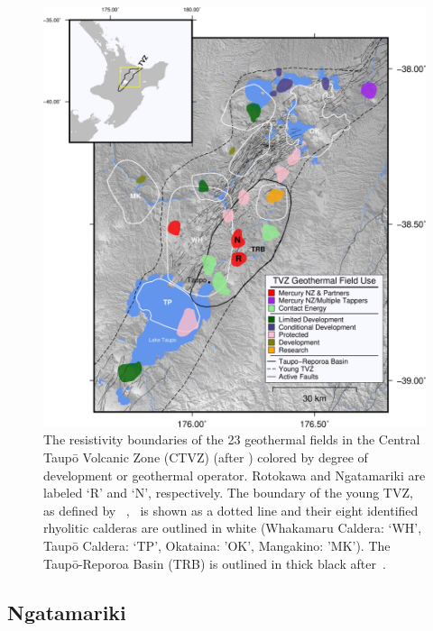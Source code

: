 \begin{figure}[h!]
\begin{center}
\includegraphics[width=1.00\columnwidth]{Chapter_1_Intro/figures/Geothermal_fields_TVZ_w_usage/TVZ_geothermal_overview_large}
\caption{{The resistivity boundaries of the 23 geothermal fields in the Central
Taup\={o} Volcanic Zone (CTVZ) (after \protect\citet{Bibby_1995}) colored by degree
of development or geothermal operator. Rotokawa and Ngatamariki are
labeled `R' and `N', respectively. The boundary of the young TVZ, as
defined by~\protect\citet{Wilson_1995} ,~ is shown as a dotted line and their
eight identified rhyolitic calderas are outlined in white (Whakamaru
Caldera: `WH', Taup\={o} Caldera: `TP', Okataina: 'OK', Mangakino: 'MK'). The Taup\={o}-Reporoa
Basin (TRB) is outlined in thick black after~\protect\citet{Downs_2014}.~~
{\label{764580}}%
}}
\end{center}
\end{figure}

\subsection{Ngatamariki}
